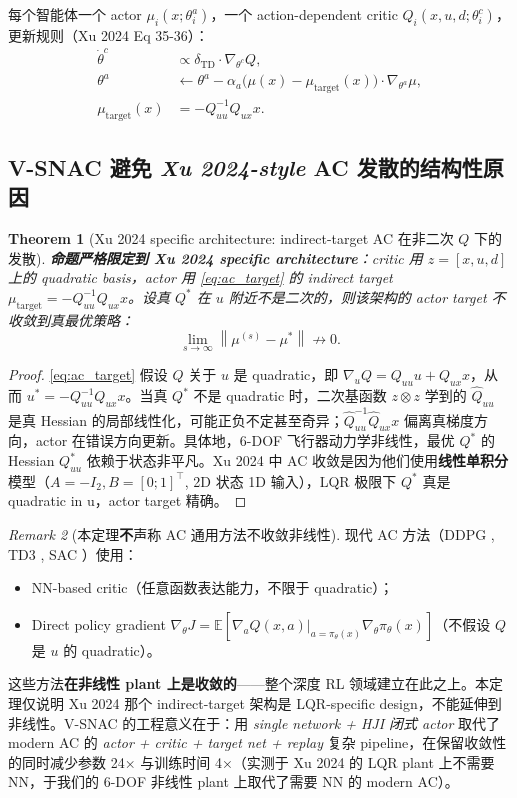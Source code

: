 \documentclass[11pt,a4paper]{article}
\newcommand{\E}{\mathbb{E}}
\newcommand{\norm}[1]{\left\lVert #1 \right\rVert}
\newtheorem{theorem}{Theorem}
\theoremstyle{remark}
\newtheorem{remark}[theorem]{Remark}
\begin{document}
每个智能体一个 actor $\mu_i(x;\theta_i^a)$，一个 action-dependent critic $Q_i(x,u,d;\theta_i^c)$，更新规则（Xu 2024 Eq 35-36）：
\begin{align}
\dot\theta^c &\propto \delta_{\text{TD}}\cdot\nabla_{\theta^c}Q,\\
\theta^a &\leftarrow \theta^a-\alpha_a\big(\mu(x)-\mu_{\text{target}}(x)\big)\cdot\nabla_{\theta^a}\mu,\\
\mu_{\text{target}}(x) &= -Q_{uu}^{-1}Q_{ux}x. \label{eq:ac_target}
\end{align}

\subsection{V-SNAC 避免 \emph{Xu 2024-style} AC 发散的结构性原因}

\begin{theorem}[Xu 2024 specific architecture: indirect-target AC 在非二次 $Q$ 下的发散]\label{thm:ac_divergence}
\textbf{命题严格限定到 Xu 2024 specific architecture}：critic 用 $z=[x,u,d]$ 上的 quadratic basis，actor 用 \eqref{eq:ac_target} 的 indirect target $\mu_{\text{target}}=-Q_{uu}^{-1}Q_{ux}x$。设真 $Q^*$ 在 $u$ 附近不是二次的，则该架构的 actor target 不收敛到真最优策略：
\begin{equation}
\lim_{s\to\infty}\norm{\mu^{(s)}-\mu^*}\not\to 0.
\end{equation}
\end{theorem}

\begin{proof}
\eqref{eq:ac_target} 假设 $Q$ 关于 $u$ 是 quadratic，即 $\nabla_u Q=Q_{uu}u+Q_{ux}x$，从而 $u^*=-Q_{uu}^{-1}Q_{ux}x$。当真 $Q^*$ 不是 quadratic 时，二次基函数 $z\otimes z$ 学到的 $\hat Q_{uu}$ 是真 Hessian 的局部线性化，可能正负不定甚至奇异；$\hat Q_{uu}^{-1}\hat Q_{ux}x$ 偏离真梯度方向，actor 在错误方向更新。具体地，6-DOF 飞行器动力学非线性，最优 $Q^*$ 的 Hessian $Q^*_{uu}$ 依赖于状态非平凡。Xu 2024 中 AC 收敛是因为他们使用\textbf{线性单积分} 模型（$A=-I_2,B=[0;1]^\top$, 2D 状态 1D 输入），LQR 极限下 $Q^*$ 真是 quadratic in u，actor target 精确。
\end{proof}

\begin{remark}[本定理\textbf{不}声称 AC 通用方法不收敛非线性]\label{rem:ac_caveat}
现代 AC 方法（DDPG \cite{ddpg}, TD3 \cite{td3}, SAC \cite{sac}）使用：
\begin{itemize}
\item NN-based critic（任意函数表达能力，不限于 quadratic）；
\item Direct policy gradient $\nabla_\theta J = \E[\nabla_a Q(x,a)|_{a=\pi_\theta(x)}\nabla_\theta \pi_\theta(x)]$（不假设 $Q$ 是 $u$ 的 quadratic）。
\end{itemize}
这些方法\textbf{在非线性 plant 上是收敛的}——整个深度 RL 领域建立在此之上。本定理仅说明 Xu 2024 那个 indirect-target 架构是 LQR-specific design，不能延伸到非线性。V-SNAC 的工程意义在于：用 \emph{single network + HJI 闭式 actor} 取代了 modern AC 的 \emph{actor + critic + target net + replay} 复杂 pipeline，在保留收敛性的同时减少参数 24× 与训练时间 4×（实测于 Xu 2024 的 LQR plant 上不需要 NN，于我们的 6-DOF 非线性 plant 上取代了需要 NN 的 modern AC）。
\end{remark}
\end{document}
